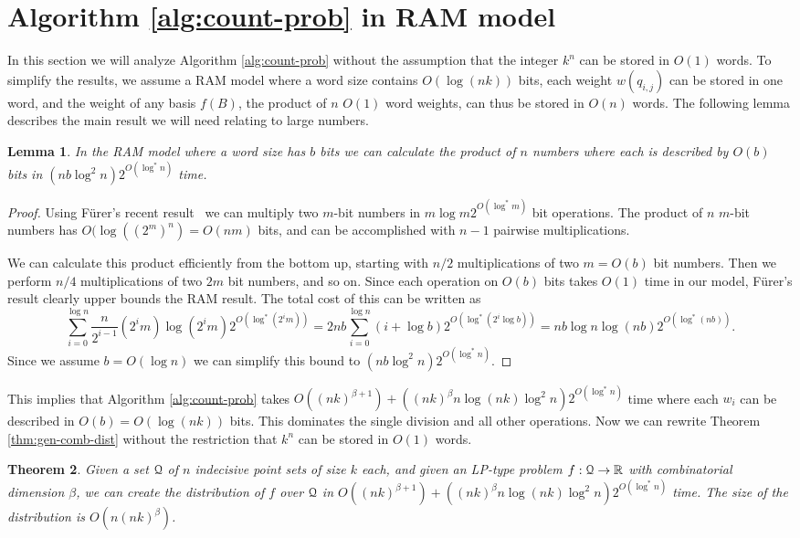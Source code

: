 \documentclass{journal}
\newcommand{\Eu}[1]{\ensuremath{\EuScript{#1}}}
\newcommand{\R}{\ensuremath{\mathbb{R}}}
\newtheorem {theorem}{Theorem}[section]
\newtheorem {lemma}[theorem]{Lemma}
\begin{document}
\section{Algorithm \ref{alg:count-prob} in RAM model}
\label{sec:bignum}
In this section we will analyze Algorithm \ref{alg:count-prob} without the assumption that the integer $k^n$ can be stored in $O(1)$ words.  
To simplify the results, we assume a RAM model where a word size contains $O(\log (nk))$ bits, each weight $w(q_{i,j})$ can be stored in one word, and the weight of any basis $f(B)$, the product of $n$ $O(1)$ word weights, can thus be stored in $O(n)$ words.
The following lemma describes the main result we will need relating to large numbers.
\begin{lemma}
In the RAM model where a word size has $b$ bits we can calculate the product of $n$ numbers where each is described by $O(b)$ bits in $(n b \log^2 n) 2^{O(\log^* n)}$ time.
\end{lemma}
\begin{proof}
Using F\"urer's recent result~\cite{Fur09} we can multiply two $m$-bit numbers in $m \log m 2^{O(\log^* m)}$ bit operations.  The product of $n$ $m$-bit numbers has $O(\log ((2^m)^n) = O(nm)$ bits, and can be accomplished with $n-1$ pairwise multiplications.

We can calculate this product efficiently from the bottom up, starting with $n/2$ multiplications of two $m=O(b)$ bit numbers.  Then we perform $n/4$ multiplications of two $2m$ bit numbers, and so on.  Since each operation on $O(b)$ bits takes $O(1)$ time in our model, F\"urer's result clearly upper bounds the RAM result.
The total cost of this can be written as
\[
\sum_{i=0}^{\log n} \frac{n}{2^{i-1}} (2^i m) \log (2^i m) 2^{O(\log^* (2^i m))}
=
2nb \sum_{i=0}^{\log n} (i+\log b) 2^{O(\log^* (2^i\log b))}
=
nb \log n \log (nb) 2^{O(\log^* (nb))}.
\]
Since we assume $b = O(\log n)$ we can simplify this bound to $(nb \log^2 n) 2^{O(\log^*n)}$.
\end{proof}

This implies that Algorithm \ref{alg:count-prob} takes $O((nk)^{\beta+1}) + ((nk)^{\beta}n \log (nk) \log^2 n)2^{O(\log^* n)}$ time where each $w_i$ can be described in $O(b) = O(\log (nk))$ bits.  This dominates the single division and all other operations.  
Now we can rewrite Theorem \ref{thm:gen-comb-dist} without the restriction that $k^n$ can be stored in $O(1)$ words.  

\begin{theorem}
Given a set $\Eu Q$ of $n$ indecisive point sets of size $k$ each, and given an LP-type problem $f : \Eu Q \to \R$ with combinatorial dimension $\beta$, we can create the distribution of $f$ over $\Eu Q$ in $O((nk)^{\beta+1}) + ((nk)^{\beta} n \log(nk) \log^2 n)2^{O(\log^* n)}$ time.  The size of the distribution is $O(n (nk)^\beta)$.
\label{thm:gen-comb-dist-bignum}
\end{theorem}
\end{document}
